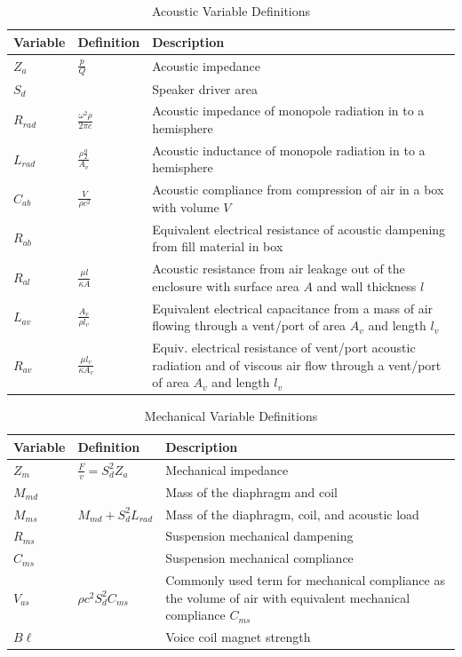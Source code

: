 \documentclass[10pt]{book}
\begin{document}
\begin{table}
\centering
\renewcommand{\arraystretch}{1.5}
\begin{tabularx}{\textwidth}{@{} ll X @{}}
\toprule
Variable & Definition & Description \\
\midrule
$Z_a$ & $\frac{p}{Q}$ & Acoustic impedance\\
$S_d$ & & Speaker driver area\\
$R_{rad}$ & $\frac{\omega^2 \rho}{2\pi c}$ & Acoustic impedance of monopole radiation in to a hemisphere\\
$L_{rad}$ & $\frac{\rho \frac{a}{2}}{A_v}$ & Acoustic inductance of monopole radiation in to a hemisphere\\
$C_{ab}$ & $\frac{V}{\rho c^2}$ & Acoustic compliance from compression of air in a box with volume $V$\\
$R_{ab}$ & & Equivalent electrical resistance of acoustic dampening from fill material in box\\
$R_{al}$ & $\frac{\mu l}{\kappa A}$ & Acoustic resistance from air leakage out of the enclosure with surface area $A$ and wall thickness $l$\\
$L_{av}$ & $\frac{A_v}{\rho l_v}$ & Equivalent electrical capacitance from a mass of air flowing through a vent/port of area $A_v$ and length $l_v$\\
$R_{av}$ & $\frac{\mu l_v}{\kappa A_v}$ & Equiv. electrical resistance of vent/port acoustic radiation and of viscous air flow through a vent/port of area $A_v$ and length $l_v$\\
\bottomrule
\end{tabularx}
\caption{Acoustic Variable Definitions}\label{table:acoustic-variables}
\end{table}

\begin{table}
\centering
\renewcommand{\arraystretch}{1.5}
\begin{tabularx}{\textwidth}{@{} ll X @{}}
\toprule
Variable & Definition & Description \\
\midrule
$Z_m$ & $\frac{F}{v}=S_d^2 Z_a$ & Mechanical impedance\\
$M_{md}$ & & Mass of the diaphragm and coil\\
$M_{ms}$ &$M_{md}+S_d^2L_{rad}$ & Mass of the diaphragm, coil, and acoustic load\\
$R_{ms}$ & & Suspension mechanical dampening\\
$C_{ms}$ &  & Suspension mechanical compliance\\
$V_{as}$ & $\rho c^2 S_d^2 C_{ms}$  & Commonly used term for mechanical compliance as the volume of air with equivalent mechanical compliance $C_{ms}$\\
$B\ell$ & & Voice coil magnet strength \\
\bottomrule
\end{tabularx}
\caption{Mechanical Variable Definitions}\label{table:mech-variables}
\end{table}
\end{document}

